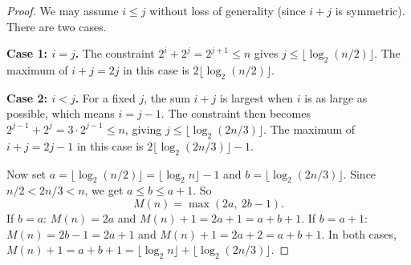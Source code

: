 \documentclass[10pt,a4paper]{amsart}
\begin{document}
\begin{proof}
We may assume $i \leq j$ without loss of generality (since $i + j$ is symmetric). There are two cases.

\textbf{Case 1: $i = j$.} The constraint $2^i + 2^j = 2^{j+1} \leq n$ gives $j \leq \lfloor \log_2(n/2) \rfloor$. The maximum of $i + j = 2j$ in this case is $2\lfloor \log_2(n/2) \rfloor$.

\textbf{Case 2: $i < j$.} For a fixed $j$, the sum $i + j$ is largest when $i$ is as large as possible, which means $i = j - 1$. The constraint then becomes $2^{j-1} + 2^j = 3 \cdot 2^{j-1} \leq n$, giving $j \leq \lfloor \log_2(2n/3) \rfloor$. The maximum of $i + j = 2j - 1$ in this case is $2\lfloor \log_2(2n/3) \rfloor - 1$.

Now set $a = \lfloor \log_2(n/2) \rfloor = \lfloor \log_2 n \rfloor - 1$ and $b = \lfloor \log_2(2n/3) \rfloor$. Since $n/2 < 2n/3 < n$, we get $a \leq b \leq a + 1$. So
\[
M(n) = \max(2a,\ 2b - 1).
\]
If $b = a$: $M(n) = 2a$ and $M(n) + 1 = 2a + 1 = a + b + 1$. If $b = a + 1$: $M(n) = 2b - 1 = 2a + 1$ and $M(n) + 1 = 2a + 2 = a + b + 1$. In both cases, $M(n) + 1 = a + b + 1 = \lfloor \log_2 n \rfloor + \lfloor \log_2(2n/3) \rfloor$.
\end{proof}
\end{document}
